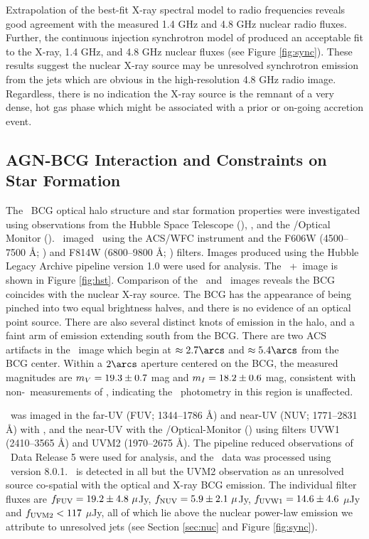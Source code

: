 \documentclass[11pt, preprint]{aastex}
\begin{document}
Extrapolation of the best-fit X-ray spectral model to radio
frequencies reveals good agreement with the measured 1.4 GHz and 4.8
GHz nuclear radio fluxes. Further, the continuous injection
synchrotron model of \citet{1987MNRAS.225..335H} produced an
acceptable fit to the X-ray, 1.4 GHz, and 4.8 GHz nuclear fluxes (see
Figure \ref{fig:sync}). These results suggest the nuclear X-ray source
may be unresolved synchrotron emission from the jets which are obvious
in the high-resolution 4.8 GHz radio image. Regardless, there is no
indication the X-ray source is the remnant of a very dense, hot gas
phase which might be associated with a prior or on-going accretion
event.

\subsection{AGN-BCG Interaction and Constraints on Star Formation}
\label{sec:bcg}

The \rbs\ BCG optical halo structure and star formation properties
were investigated using observations from the Hubble Space Telescope
(\hst), \galex, and the \xmm/Optical Monitor (\xom). \hst\ imaged
\rbs\ using the ACS/WFC instrument and the F606W (4500--7500 \AA;
\myv) and F814W (6800--9800 \AA; \myi) filters. Images produced using
the Hubble Legacy Archive pipeline version 1.0 were used for
analysis. The \hst\ \myv+\myi\ image is shown in Figure
\ref{fig:hst}. Comparison of the \hst\ and \cxo\ images reveals the
BCG coincides with the nuclear X-ray source. The BCG has the
appearance of being pinched into two equal brightness halves, and
there is no evidence of an optical point source. There are also
several distinct knots of emission in the halo, and a faint arm of
emission extending south from the BCG. There are two ACS artifacts in
the \myi\ image which begin at $\approx 2.7\arcs$ and $\approx
5.4\arcs$ from the BCG center. Within a $2\arcs$ aperture centered on
the BCG, the measured magnitudes are $m_{V} = 19.3 \pm 0.7$ mag and
$m_{I} = 18.2 \pm 0.6$ mag, consistent with non-\hst\ measurements
of \citet{rbs1}, indicating the \hst\ photometry in this region is
unaffected.

\rbs\ was imaged in the far-UV (FUV; 1344--1786 \AA) and near-UV (NUV;
1771--2831 \AA) with \galex, and the near-UV with the
\xmm/Optical-Monitor (\xom) using filters UVW1 (2410--3565 \AA) and
UVM2 (1970--2675 \AA). The pipeline reduced observations of
\galex\ Data Release 5 were used for analysis, and the \xom\ data was
processed using \sas\ version 8.0.1. \rbs\ is detected in all but the
UVM2 observation as an unresolved source co-spatial with the optical
and X-ray BCG emission. The individual filter fluxes are $f_{\rm{FUV}}
= 19.2 \pm 4.8 ~\mu$Jy, $f_{\rm{NUV}} = 5.9 \pm 2.1 ~\mu$Jy,
$f_{\rm{UVW1}} = 14.6 \pm 4.6$ $\mu$Jy and $f_{\rm{UVM2}} < 117$
$\mu$Jy, all of which lie above the nuclear power-law emission we
attribute to unresolved jets (see Section \ref{sec:nuc} and Figure
\ref{fig:sync}).
\end{document}
